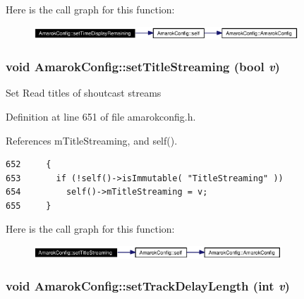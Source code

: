 Here is the call graph for this function:\begin{figure}[H]
\begin{center}
\leavevmode
\includegraphics[width=281pt]{classAmarokConfig_AmarokConfige13_cgraph}
\end{center}
\end{figure}
\subsubsection{\setlength{\rightskip}{0pt plus 5cm}void Amarok\-Config::set\-Title\-Streaming (bool {\em v})\hspace{0.3cm}{\tt  [inline, static]}}\label{classAmarokConfig_AmarokConfige67}


Set Read titles of shoutcast streams 

Definition at line 651 of file amarokconfig.h.

References m\-Title\-Streaming, and self().



\footnotesize\begin{verbatim}652     {
653       if (!self()->isImmutable( "TitleStreaming" ))
654         self()->mTitleStreaming = v;
655     }
\end{verbatim}\normalsize 


Here is the call graph for this function:\begin{figure}[H]
\begin{center}
\leavevmode
\includegraphics[width=263pt]{classAmarokConfig_AmarokConfige67_cgraph}
\end{center}
\end{figure}
\subsubsection{\setlength{\rightskip}{0pt plus 5cm}void Amarok\-Config::set\-Track\-Delay\-Length (int {\em v})\hspace{0.3cm}{\tt  [inline, static]}}\label{classAmarokConfig_AmarokConfige33}


